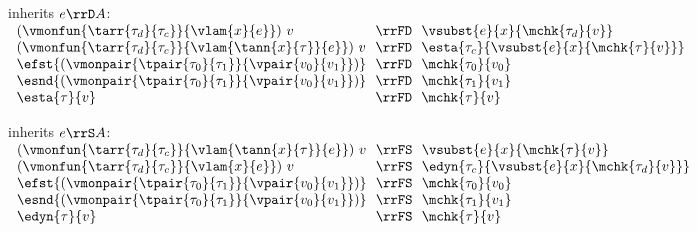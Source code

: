 \begin{flushleft}
\medskip
\begin{minipage}[t]{\columnwidth}
 inherits $e \rrD A$:\\
$\begin{array}{l@{~~}c@{~~}l}
  (\vmonfun{\tarr{\tau_d}{\tau_c}}{\vlam{x}{e}})~v & \rrFD & \vsubst{e}{x}{\mchk{\tau_d}{v}}
\\
  (\vmonfun{\tarr{\tau_d}{\tau_c}}{\vlam{\tann{x}{\tau}}{e}})~v & \rrFD & \esta{\tau_c}{\vsubst{e}{x}{\mchk{\tau}{v}}}
\\
  \efst{(\vmonpair{\tpair{\tau_0}{\tau_1}}{\vpair{v_0}{v_1}})} & \rrFD & \mchk{\tau_0}{v_0}
\\
  \esnd{(\vmonpair{\tpair{\tau_0}{\tau_1}}{\vpair{v_0}{v_1}})} & \rrFD & \mchk{\tau_1}{v_1}
\\
  \esta{\tau}{v} & \rrFD & \mchk{\tau}{v}
\end{array}$
\end{minipage}%
\begin{minipage}[t]{\columnwidth}
 inherits $e \rrS A$:\\
$\begin{array}{l@{~~}c@{~~}l}
  (\vmonfun{\tarr{\tau_d}{\tau_c}}{\vlam{\tann{x}{\tau}}{e}})~v & \rrFS & \vsubst{e}{x}{\mchk{\tau}{v}}
\\
  (\vmonfun{\tarr{\tau_d}{\tau_c}}{\vlam{x}{e}})~v & \rrFS & \edyn{\tau_c}{\vsubst{e}{x}{\mchk{\tau_d}{v}}}
\\
  \efst{(\vmonpair{\tpair{\tau_0}{\tau_1}}{\vpair{v_0}{v_1}})} & \rrFS & \mchk{\tau_0}{v_0}
\\
  \esnd{(\vmonpair{\tpair{\tau_0}{\tau_1}}{\vpair{v_0}{v_1}})} & \rrFS & \mchk{\tau_1}{v_1}
\\
  \edyn{\tau}{v} & \rrFS & \mchk{\tau}{v}
\end{array}$
\end{minipage}


\end{flushleft}
